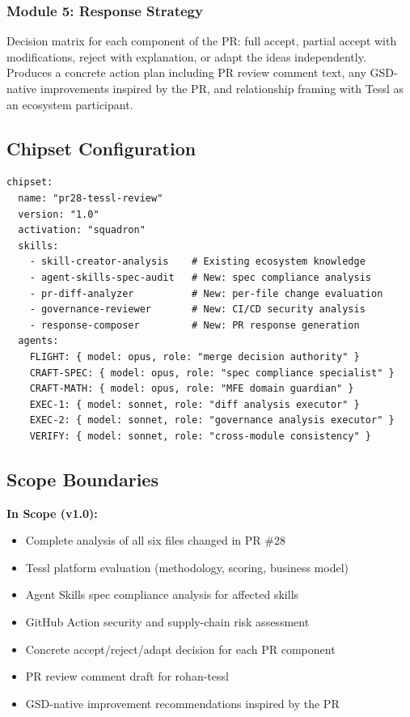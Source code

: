 \documentclass[11pt,letterpaper]{article}
\begin{document}
\subsubsection{Module 5: Response Strategy}
Decision matrix for each component of the PR: full accept, partial accept with modifications, reject with explanation, or adapt the ideas independently. Produces a concrete action plan including PR review comment text, any GSD-native improvements inspired by the PR, and relationship framing with Tessl as an ecosystem participant.

\subsection{Chipset Configuration}

\begin{asciibox}
\begin{verbatim}
chipset:
  name: "pr28-tessl-review"
  version: "1.0"
  activation: "squadron"
  skills:
    - skill-creator-analysis    # Existing ecosystem knowledge
    - agent-skills-spec-audit   # New: spec compliance analysis
    - pr-diff-analyzer          # New: per-file change evaluation
    - governance-reviewer       # New: CI/CD security analysis
    - response-composer         # New: PR response generation
  agents:
    FLIGHT: { model: opus, role: "merge decision authority" }
    CRAFT-SPEC: { model: opus, role: "spec compliance specialist" }
    CRAFT-MATH: { model: opus, role: "MFE domain guardian" }
    EXEC-1: { model: sonnet, role: "diff analysis executor" }
    EXEC-2: { model: sonnet, role: "governance analysis executor" }
    VERIFY: { model: sonnet, role: "cross-module consistency" }
\end{verbatim}
\end{asciibox}

\subsection{Scope Boundaries}

\textbf{In Scope (v1.0):}
\begin{itemize}[leftmargin=2em]
\item Complete analysis of all six files changed in PR \#28
\item Tessl platform evaluation (methodology, scoring, business model)
\item Agent Skills spec compliance analysis for affected skills
\item GitHub Action security and supply-chain risk assessment
\item Concrete accept/reject/adapt decision for each PR component
\item PR review comment draft for rohan-tessl
\item GSD-native improvement recommendations inspired by the PR
\end{itemize}
\end{document}
